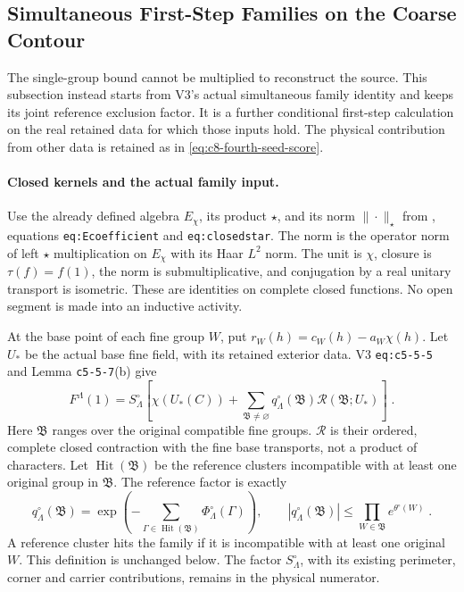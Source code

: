\documentclass[11pt]{article}
\begin{document}
\subsection{Simultaneous First-Step Families on the Coarse Contour}
\label{sec:c8-fourth-coarse-families}

The single-group bound cannot be multiplied to reconstruct the
source. This subsection instead starts from V3's actual simultaneous
family identity and keeps its joint reference exclusion factor.
It is a further conditional first-step calculation on the real
retained data for which those inputs hold. The physical contribution
from other data is retained as in
\eqref{eq:c8-fourth-seed-score}.

\paragraph{Closed kernels and the actual family input.}
Use the already defined algebra $E_\chi$, its product $\star$,
and its norm $\|\cdot\|_\star$ from
, equations
\texttt{eq:Ecoefficient} and \texttt{eq:closedstar}.
The norm is the operator
norm of left $\star$ multiplication on $E_\chi$ with its Haar
$L^2$ norm. The unit is $\chi$, closure is $\tau(f)=f(1)$,
the norm is submultiplicative, and conjugation by a real unitary
transport is isometric. These are identities on complete closed
functions. No open segment is made into an inductive activity.

At the base point of each fine group $W$, put
$r_W(h)=c_W(h)-a_W\chi(h)$. Let $U_*$ be the actual base fine
field, with its retained exterior data. V3
\texttt{eq:c5-5-5} and Lemma \texttt{c5-5-7}(b) give
\begin{equation}\label{eq:c8-fourth-input-families}
    F^\Lambda(1)=S^\circ_\Lambda\left[
        \chi(U_*(C))+
        \sum_{\mathfrak B\neq\varnothing}
            q^\circ_\Lambda(\mathfrak B)
            \mathcal R(\mathfrak B;U_*)\right]\;.
\end{equation}
Here $\mathfrak B$ ranges over the original compatible fine
groups. $\mathcal R$ is their ordered, complete closed contraction
with the fine base transports, not a product of characters.
Let $\operatorname{Hit}(\mathfrak B)$ be the reference clusters
incompatible with at least one original group in $\mathfrak B$.
The reference factor is exactly
\begin{equation}\label{eq:c8-fourth-joint-exclusion}
    q^\circ_\Lambda(\mathfrak B)
        =\exp\left(-\sum_{\Gamma\in\operatorname{Hit}(\mathfrak B)}
            \Phi^\circ_\Lambda(\Gamma)\right),\qquad
    |q^\circ_\Lambda(\mathfrak B)|
        \leq\prod_{W\in\mathfrak B}e^{\theta^\circ(W)}\;.
\end{equation}
A reference cluster hits the family if it is incompatible with
at least one original $W$. This definition is unchanged below.
The factor $S^\circ_\Lambda$, with its existing perimeter, corner
and carrier contributions, remains in the physical numerator.
\end{document}
